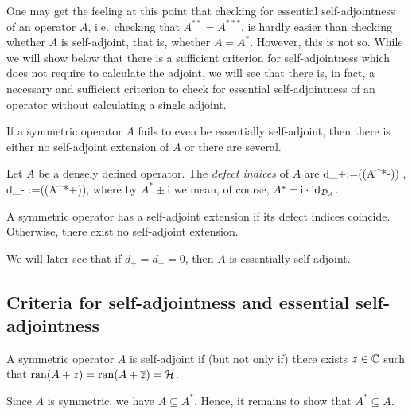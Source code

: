 \br
One may get the feeling at this point that checking for essential self-adjointness of an operator $A$, i.e.\ checking that $A^{**}=A^{***}$, is hardly easier than checking whether $A$ is self-adjoint, that is, whether $A=A^*$. However, this is not so. While we will show below that there is a sufficient criterion for self-adjointness which does not require to calculate the adjoint, we will see that there is, in fact, a necessary and sufficient criterion to check for essential self-adjointness of an operator without calculating a single adjoint.
\er

\br
If a symmetric operator $A$ fails to even be essentially self-adjoint, then there is either no self-adjoint extension of $A$ or there are several. 
\er

\bd
Let $A$ be a densely defined operator. The \emph{defect indices} of $A$ are
\bse
d_+:=\dim (\ker(A^*-)) , \qquad \quad d_- :=\dim (\ker (A^*+)),
\ese
where by $A^*\pm\mathrm{i}$ we mean, of course, $A^*\pm\mathrm{i}\cdot\operatorname{id}_{\mathcal{D}_A}$.
\ed

\bt
A symmetric operator has a self-adjoint extension if its defect indices coincide. Otherwise, there exist no self-adjoint extension.
\et

\br
We will later see that if $d_+=d_-=0$, then $A$ is essentially self-adjoint.
\er

\subsection{Criteria for self-adjointness and essential self-adjointness}


\bt
A symmetric operator $A$ is self-adjoint if (but not only if) there exists $z\in\mathbb{C}$ such that $\operatorname{ran}(A+z)=\operatorname{ran}(A+\overline{z})=\mathcal{H}$.
\et

\bq
Since $A$ is symmetric, we have $A\subseteq A^*$. Hence, it remains to show that $A^*\subseteq A$. 
\eq



























